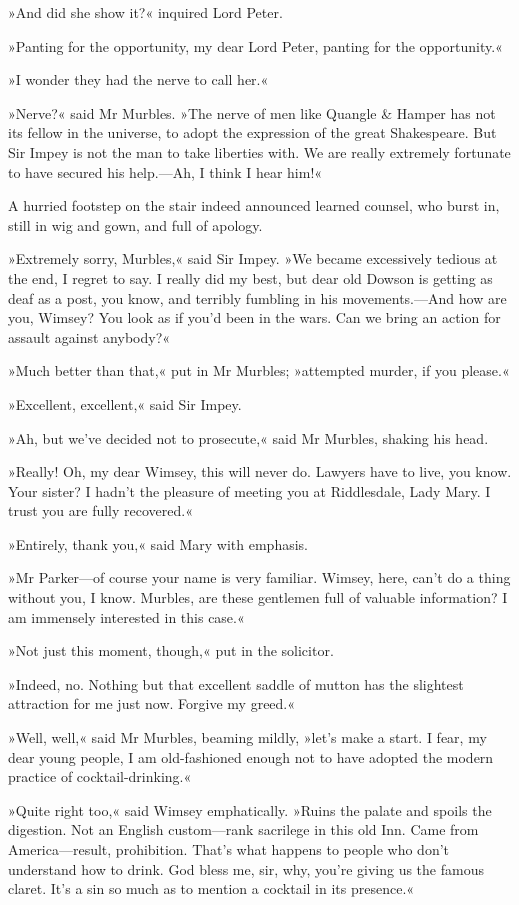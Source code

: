 »And did she show it?« inquired Lord Peter.

»Panting for the opportunity, my dear Lord Peter, panting for the opportunity.«

»I wonder they had the nerve to call her.«

»Nerve?« said Mr Murbles. »The nerve of men like Quangle \& Hamper has not its fellow in the universe, to adopt the expression of the great Shakespeare. But Sir Impey is not the man to take liberties with. We are really extremely fortunate to have secured his help.\allowbreak---\allowbreak Ah, I think I hear him!«

A hurried footstep on the stair indeed announced learned counsel, who burst in, still in wig and gown, and full of apology.

»Extremely sorry, Murbles,« said Sir Impey. »We became excessively tedious at the end, I regret to say. I really did my best, but dear old Dowson is getting as deaf as a post, you know, and terribly fumbling in his movements.---And how are you, Wimsey? You look as if you'd been in the wars. Can we bring an action for assault against anybody?«

»Much better than that,« put in Mr Murbles; »attempted murder, if you please.«

»Excellent, excellent,« said Sir Impey.

»Ah, but we've decided not to prosecute,« said Mr Murbles, shaking his head.

»Really! Oh, my dear Wimsey, this will never do. Lawyers have to live, you know. Your sister? I hadn't the pleasure of meeting you at Riddlesdale, Lady Mary. I trust you are fully recovered.«

»Entirely, thank you,« said Mary with emphasis.

»Mr Parker\allowbreak---\allowbreak of course your name is very familiar. Wimsey, here, can't do a thing without you, I know. Murbles, are these gentlemen full of valuable information? I am immensely interested in this case.«

»Not just this moment, though,« put in the solicitor.

»Indeed, no. Nothing but that excellent saddle of mutton has the slightest attraction for me just now. Forgive my greed.«

»Well, well,« said Mr Murbles, beaming mildly, »let's make a start.  I fear, my dear young people, I am old-fashioned enough not to have adopted the modern practice of cocktail-drinking.«

»Quite right too,« said Wimsey emphatically. »Ruins the palate and spoils the digestion. Not an English custom\allowbreak---\allowbreak rank sacrilege in this old Inn. Came from America\allowbreak---\allowbreak result, prohibition. That's what happens to people who don't understand how to drink. God bless me, sir, why, you're giving us the famous claret. It's a sin so much as to mention a cocktail in its presence.«

